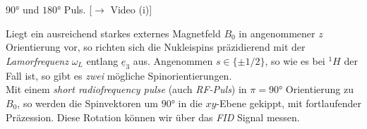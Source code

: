 \documentclass{subfiles}
\begin{document}
    \begin{Frage}
        $90\si\degree$ und $180\si\degree$ Puls. [$\to$ Video (i)]
    \end{Frage}
    \begin{Antwort}
        Liegt ein ausreichend starkes externes Magnetfeld $B_0$ in angenommener $z$ Orientierung vor, so richten sich die Nukleispins präzidierend mit der \emph{Lamorfrequenz} $\omega_L$ entlang $\underline e_3$ aus. Angenommen $s\in\{\pm 1/2\}$, so wie es bei $^1H$ der Fall ist, so gibt es \emph{zwei} mögliche Spinorientierungen. \\

        Mit einem \emph{short radiofrequency pulse} (auch \emph{RF-Puls}) in $\pi = 90\si\degree$ Orientierung zu $B_0$, so werden die Spinvektoren um $90\si\degree$ in die $xy$-Ebene gekippt, mit fortlaufender Präzession. Diese Rotation können wir über das \emph{FID} Signal messen.

        \begin{figure}[H]
            \centering
        \end{figure}
    \end{Antwort}
\end{document}

